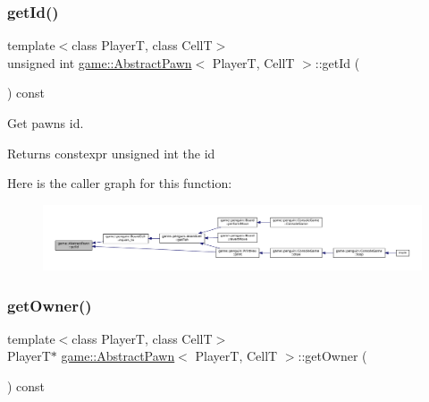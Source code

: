 \subsubsection{\texorpdfstring{get\+Id()}{getId()}}
{\footnotesize\ttfamily template$<$class PlayerT, class CellT$>$ \\
unsigned int \hyperlink{classgame_1_1_abstract_pawn}{game\+::\+Abstract\+Pawn}$<$ PlayerT, CellT $>$\+::get\+Id (\begin{DoxyParamCaption}{ }\end{DoxyParamCaption}) const\hspace{0.3cm}{\ttfamily [inline]}}



Get pawn\textquotesingle{}s id. 

\begin{DoxyReturn}{Returns}
constexpr unsigned int the id 
\end{DoxyReturn}
Here is the caller graph for this function\+:
\nopagebreak
\begin{figure}[H]
\begin{center}
\leavevmode
\includegraphics[width=350pt]{classgame_1_1_abstract_pawn_a49354506912d0e1bf5272627aa2bc86e_icgraph}
\end{center}
\end{figure}
\mbox{\label{classgame_1_1_abstract_pawn_aac49fdd8bd4aa4386fd47d3f6993b8df}} 
\subsubsection{\texorpdfstring{get\+Owner()}{getOwner()}}
{\footnotesize\ttfamily template$<$class PlayerT, class CellT$>$ \\
PlayerT$\ast$ \hyperlink{classgame_1_1_abstract_pawn}{game\+::\+Abstract\+Pawn}$<$ PlayerT, CellT $>$\+::get\+Owner (\begin{DoxyParamCaption}{ }\end{DoxyParamCaption}) const\hspace{0.3cm}{\ttfamily [inline]}}

